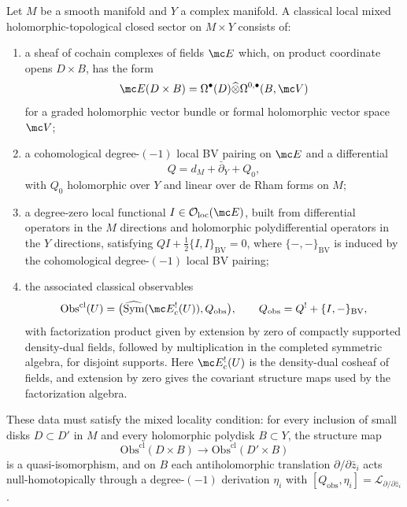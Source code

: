 \documentclass[11pt]{memoir}
\begin{document}
\begin{defn}\label{def:local-th-string}
  Let \(M\) be a smooth manifold and \(Y\) a complex manifold.  A
  classical local mixed holomorphic-topological closed sector on
  \(M\times Y\) consists of:
  \begin{enumerate}
    \item a sheaf of cochain complexes of fields \(\mc E\) which, on
      product coordinate opens \(D\times B\), has the form
      \[
        \mc E(D\times B)
         =\Omega^\bullet(D)\widehat\otimes
            \Omega^{0,\bullet}(B,\mc V)
      \]
      for a graded holomorphic vector bundle or formal holomorphic
      vector space \(\mc V\);
    \item a cohomological degree-\((-1)\) local BV pairing on \(\mc E\)
      and a
      differential
      \[
        Q=d_M+\bar\partial_Y+Q_0,
      \]
      with \(Q_0\) holomorphic over \(Y\) and linear over de Rham
      forms on \(M\);
    \item a degree-zero local functional
      \(I\in\mathcal O_{\mathrm{loc}}(\mc E)\), built from
      differential operators in the \(M\) directions and holomorphic
      polydifferential operators in the \(Y\) directions, satisfying
      \(QI+\tfrac12\{I,I\}_{\mathrm{BV}}=0\), where
      \(\{-,-\}_{\mathrm{BV}}\) is induced by the cohomological
      degree-\((-1)\) local BV pairing;
    \item the associated classical observables
	      \[
	        \mathrm{Obs}^{\mathrm{cl}}(U)
	         =\bigl(\widehat{\mathrm{Sym}}(\mc E^!_c(U)),
	            Q_{\mathrm{obs}}\bigr),\qquad
	         Q_{\mathrm{obs}}=Q^!+\{I,-\}_{\mathrm{BV}},
	      \]
	      with factorization product given by extension by zero of compactly
	      supported density-dual fields, followed by multiplication in the
	      completed symmetric algebra, for disjoint supports.
	      Here \(\mc E^!_c(U)\) is the density-dual cosheaf of fields,
	      and extension by zero gives the covariant structure maps used
	      by the factorization algebra.
  \end{enumerate}
  These data must satisfy the mixed locality condition: for every
  inclusion of small disks \(D\subset D'\) in \(M\) and every
  holomorphic polydisk \(B\subset Y\), the structure map
  \[
    \mathrm{Obs}^{\mathrm{cl}}(D\times B)\longrightarrow
    \mathrm{Obs}^{\mathrm{cl}}(D'\times B)
  \]
  is a quasi-isomorphism, and on \(B\) each antiholomorphic
  translation \(\partial/\partial\bar z_i\) acts null-homotopically
  through a degree-\((-1)\) derivation \(\eta_i\) with
  \([Q_{\mathrm{obs}},\eta_i]
   =\mathcal L_{\partial/\partial\bar z_i}\).


\end{defn}
\end{document}

